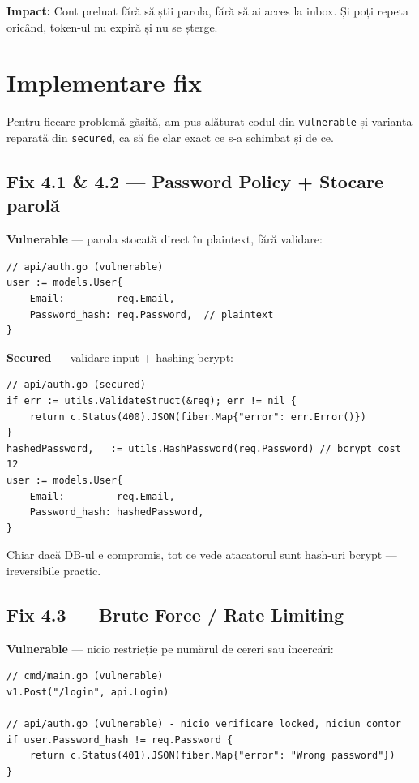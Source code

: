 \documentclass[12pt]{article}
\begin{document}
\textbf{Impact:} Cont preluat fără să știi parola, fără să ai acces la inbox. Și poți repeta oricând, token-ul nu expiră și nu se șterge.


\newpage
\section{Implementare fix}

Pentru fiecare problemă găsită, am pus alăturat codul din \texttt{vulnerable} și varianta
reparată din \texttt{secured}, ca să fie clar exact ce s-a schimbat și de ce.

\subsection{Fix 4.1 \& 4.2 --- Password Policy + Stocare parolă}

\textbf{Vulnerable} --- parola stocată direct în plaintext, fără validare:
\begin{lstlisting}[language={}]
// api/auth.go (vulnerable)
user := models.User{
    Email:         req.Email,
    Password_hash: req.Password,  // plaintext
}
\end{lstlisting}

\textbf{Secured} --- validare input + hashing bcrypt:
\begin{lstlisting}[language={}]
// api/auth.go (secured)
if err := utils.ValidateStruct(&req); err != nil {
    return c.Status(400).JSON(fiber.Map{"error": err.Error()})
}
hashedPassword, _ := utils.HashPassword(req.Password) // bcrypt cost 12
user := models.User{
    Email:         req.Email,
    Password_hash: hashedPassword,
}
\end{lstlisting}

Chiar dacă DB-ul e compromis, tot ce vede atacatorul sunt hash-uri bcrypt --- ireversibile practic.

\subsection{Fix 4.3 --- Brute Force / Rate Limiting}

\textbf{Vulnerable} --- nicio restricție pe numărul de cereri sau încercări:
\begin{lstlisting}[language={}]
// cmd/main.go (vulnerable)
v1.Post("/login", api.Login)

// api/auth.go (vulnerable) - nicio verificare locked, niciun contor
if user.Password_hash != req.Password {
    return c.Status(401).JSON(fiber.Map{"error": "Wrong password"})
}
\end{lstlisting}
\end{document}
